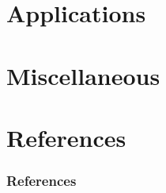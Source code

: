 \documentclass{beamer}
\begin{document}
\section{Applications}


\section{Miscellaneous}



\section{References}
\begin{frame}
\frametitle{References}
{\tiny 

}
\end{frame} 

\end{document}
